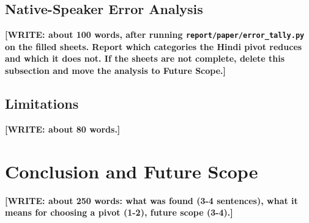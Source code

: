 \documentclass[conference]{IEEEtran}
\newcommand{\WRITE}[1]{{\color{red}\textbf{[WRITE: #1]}}}
\begin{document}


\subsection{Native-Speaker Error Analysis}

\WRITE{about 100 words, after running \texttt{report/paper/error\_tally.py} on the
filled sheets. Report which categories the Hindi pivot reduces and which
it does not. If the sheets are not complete, delete this subsection and
move the analysis to Future Scope.}

\subsection{Limitations}

\WRITE{about 80 words.}

\section{Conclusion and Future Scope}

\WRITE{about 250 words: what was found (3-4 sentences), what it means for
choosing a pivot (1-2), future scope (3-4).}
\end{document}
